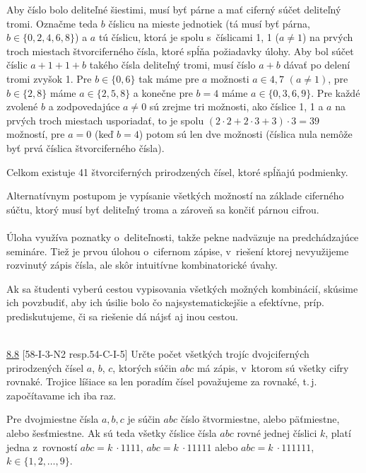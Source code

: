 \rieh  Aby číslo bolo deliteľné šiestimi, musí byť párne a mať ciferný súčet deliteľný tromi. Označme teda $b$ číslicu na mieste jednotiek (tá musí byť párna, $b \in \{0, 2, 4, 6, 8\}$) a $a$ tú číslicu, ktorá je spolu s~číslicami 1, 1 ($a \neq 1$) na prvých troch miestach štvorciferného čísla, ktoré spĺňa požiadavky úlohy. Aby bol súčet číslic $a + 1 + 1 + b$ takého čísla deliteľný tromi, musí číslo $a + b$ dávať po delení tromi zvyšok 1. Pre $b \in \{0, 6\}$ tak máme pre $a$ možnosti $a \in {4, 7}$ $(a \neq 1)$, pre $b \in \{2, 8\}$ máme $a \in \{2, 5, 8\}$ a konečne pre $b = 4$ máme $a \in \{0, 3, 6, 9\}$. Pre každé zvolené $b$ a zodpovedajúce $a \neq 0$ sú zrejme tri možnosti, ako číslice 1, 1 a $a$ na prvých troch miestach usporiadať, to je spolu $(2 \cdot 2 + 2 \cdot 3 + 3) \cdot 3 = 39$ možností, pre $a = 0$ (keď $b = 4$) potom sú len dve možnosti (číslica nula nemôže byť prvá číslica štvorciferného čísla).

Celkom existuje 41 štvorciferných prirodzených čísel, ktoré spĺňajú podmienky.

Alternatívnym postupom je vypísanie všetkých možností na základe ciferného súčtu, ktorý musí byť deliteľný troma a zároveň sa končiť párnou cifrou.\\
\\
\kom Úloha využíva poznatky o~deliteľnosti, takže pekne nadväzuje na predchádzajúce semináre. Tiež je prvou úlohou o~cifernom zápise, v~riešení ktorej nevyužijeme rozvinutý zápis čísla, ale skôr intuitívne kombinatorické úvahy.

Ak sa študenti vyberú cestou vypisovania všetkých možných kombinácií, skúsime ich povzbudiť, aby ich úsilie bolo čo najsystematickejšie a efektívne, príp. prediskutujeme, či sa riešenie dá nájsť aj inou cestou. \\
\\
\begin{tcolorbox}[breakable,notitle,boxrule=0pt,colback=light-gray,colframe=light-gray]\ul{8.8} [58-I-3-N2 resp.54-C-I-5]  Určte počet všetkých trojíc dvojciferných prirodzených čísel $a$, $b$, $c$, ktorých súčin $abc$ má zápis, v~ktorom sú všetky cifry rovnaké. Trojice líšiace sa len poradím čísel považujeme za rovnaké,  t.\,j. započítavame ich iba raz.

\end{tcolorbox}

\rieh Pre dvojmiestne čísla $a, b, c$ je súčin $abc$ číslo štvormiestne, alebo päťmiestne, alebo šesťmiestne. Ak sú teda všetky číslice čísla $abc$ rovné jednej číslici $k$, platí jedna z~rovností $abc = k~\cdot 1 111$, $abc = k~\cdot 11 111$ alebo $abc = k~\cdot 111 111$, $k \in \{1, 2, \ldots , 9\}$.


